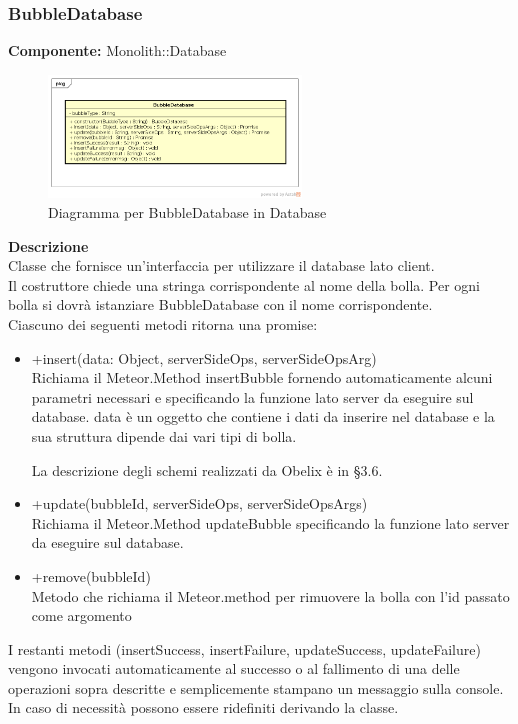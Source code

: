 \clearpage

\subsubsection{BubbleDatabase}
\textbf{Componente:}  Monolith::Database\\
   \FloatBarrier
   \begin{figure}[ht]
   \centering
   \includegraphics[width=0.6\textwidth]{img/single-BubbleDatabase.png}
   \caption{{Diagramma per BubbleDatabase in Database}}
\end{figure}
\FloatBarrier
\textbf{Descrizione}\\
Classe che fornisce un'interfaccia per utilizzare il database lato client. 
\\
Il costruttore chiede una stringa corrispondente al nome della bolla. Per ogni bolla si dovrà istanziare BubbleDatabase con il nome corrispondente.
\\
Ciascuno dei seguenti metodi ritorna una promise:
\begin{itemize} 
\item +insert(data: Object, serverSideOps, serverSideOpsArg) \\
Richiama il Meteor.Method insertBubble fornendo automaticamente alcuni parametri necessari e specificando la funzione lato server da eseguire sul database. data è un oggetto che contiene i dati da inserire nel database e la sua struttura dipende dai vari tipi di bolla.

La descrizione degli schemi realizzati da Obelix è in \S 3.6.

\item +update(bubbleId, serverSideOps, serverSideOpsArgs) \\
Richiama il Meteor.Method updateBubble specificando la funzione lato server da eseguire sul database.
\item +remove(bubbleId) \\
Metodo che richiama il Meteor.method per rimuovere la bolla con l'id passato come argomento
\end{itemize}
I restanti metodi (insertSuccess, insertFailure, updateSuccess, updateFailure) vengono invocati automaticamente al successo o al fallimento di una delle operazioni sopra descritte e semplicemente stampano un messaggio sulla console. In caso di necessità possono essere ridefiniti derivando la classe.

